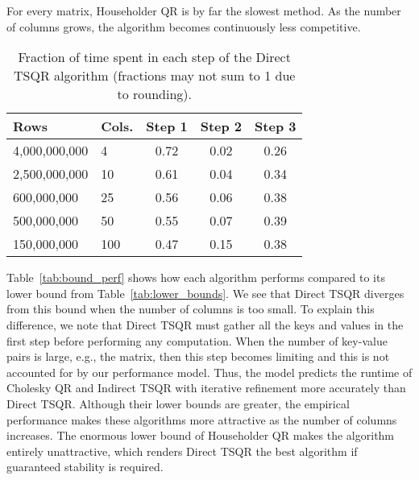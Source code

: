 \documentclass[10pt, conference, compsocconf]{IEEEtran}
\begin{document}
For every matrix, Householder QR is by far the slowest method.  As the number of columns grows, the algorithm becomes continuously less competitive.

\begin{table}[tbp]
\vspace{-\baselineskip}
\caption{Fraction of time spent in each step of the Direct TSQR algorithm (fractions may not sum to 1 due to rounding).}
\centering
\begin{tabular}{l l @{\qquad\qquad} c c c}
\toprule
Rows & Cols. & Step 1 & Step 2 & Step 3 \\
\midrule
4,000,000,000 & 4     &  0.72 & 0.02 & 0.26 \\
2,500,000,000 & 10   & 0.61 & 0.04  & 0.34 \\
600,000,000    & 25   & 0.56 & 0.06 & 0.38 \\
500,000,000    & 50   & 0.55 & 0.07 & 0.39 \\
150,000,000    & 100 & 0.47 & 0.15 & 0.38 \\
\bottomrule
\end{tabular}
\label{tab:perf_parts}
\end{table}

Table~\ref{tab:bound_perf} shows how each algorithm performs compared to its lower bound from Table~\ref{tab:lower_bounds}.  We see that Direct TSQR diverges from this bound when the number of columns is too small.  To explain this difference, we note that Direct TSQR must gather all the keys and values in the first step before performing any computation.  When the number of key-value pairs is large, e.g., the  matrix, then this step becomes limiting and this is not accounted for by our performance model.
Thus, the model predicts the runtime of Cholesky QR and Indirect TSQR with iterative refinement more accurately than Direct TSQR.  Although their lower bounds are greater, the empirical performance makes these algorithms more attractive as the number of columns increases.  The enormous lower bound of Householder QR makes the algorithm entirely unattractive, which renders Direct TSQR the best algorithm if guaranteed stability is required.
\end{document}

